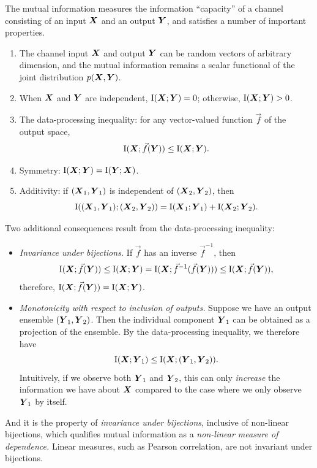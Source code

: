 \documentclass[12pt]{article}
\begin{document}
The mutual information measures the information ``capacity'' of a
channel consisting of an input $\boldsymbol{X}$ and an output $\boldsymbol{Y}$, and
satisfies a number of important properties.
\begin{enumerate}
\item The channel input $\boldsymbol{X}$ and output $\boldsymbol{Y}$ can be random vectors of arbitrary dimension, and the mutual information remains a scalar functional of the joint distribution $p(\boldsymbol{X}, \boldsymbol{Y})$.
\item When $\boldsymbol{X}$ and $\boldsymbol{Y}$ are independent, $\text{I}(\boldsymbol{X}; \boldsymbol{Y}) = 0$; otherwise, $\text{I}(\boldsymbol{X}; \boldsymbol{Y}) > 0$.
\item The data-processing inequality: for any vector-valued function $\vec{f}$ of the output space,
\[
\text{I}(\boldsymbol{X}; \vec{f}(\boldsymbol{Y})) \leq \text{I}(\boldsymbol{X}; \boldsymbol{Y}).
\]
\item Symmetry: $\text{I}(\boldsymbol{X}; \boldsymbol{Y}) = \text{I}(\boldsymbol{Y}; \boldsymbol{X})$.
\item Additivity: if $(\boldsymbol{X}_1,\boldsymbol{Y}_1)$ is independent of $(\boldsymbol{X}_2, \boldsymbol{Y}_2)$, then
\[
\text{I}((\boldsymbol{X}_1,\boldsymbol{Y}_1); (\boldsymbol{X}_2, \boldsymbol{Y}_2)) = \text{I}(\boldsymbol{X}_1; \boldsymbol{Y}_1) + \text{I}(\boldsymbol{X}_2; \boldsymbol{Y}_2).
\]
\end{enumerate}
Two additional consequences result from the data-processing inequality:
\begin{itemize}
\item \emph{Invariance under bijections.} If $\vec{f}$ has an inverse $\vec{f}^{-1}$, then 
\[
\text{I}(\boldsymbol{X}; \vec{f}(\boldsymbol{Y})) \leq \text{I}(\boldsymbol{X}; \boldsymbol{Y}) = \text{I}(\boldsymbol{X}; \vec{f}^{-1}(\vec{f}(\boldsymbol{Y}))) \leq \text{I}(\boldsymbol{X}; \vec{f}(\boldsymbol{Y})),
\]
therefore, $\text{I}(\boldsymbol{X}; \vec{f}(\boldsymbol{Y})) = \text{I}(\boldsymbol{X}; \boldsymbol{Y})$.
\item \emph{Monotonicity with respect to inclusion of outputs.}  Suppose we have an output ensemble $(\boldsymbol{Y}_1,\boldsymbol{Y}_2)$.  Then the individual component $\boldsymbol{Y}_1$ can be obtained as a projection of the ensemble.  By the data-processing inequality, we therefore have
\[
\text{I}(\boldsymbol{X}; \boldsymbol{Y}_1) \leq \text{I}(\boldsymbol{X}; (\boldsymbol{Y}_1, \boldsymbol{Y}_2)).
\]
Intuitively, if we observe both $\boldsymbol{Y}_1$ and $\boldsymbol{Y}_2$, this can
only \emph{increase} the information we have about $\boldsymbol{X}$ compared to
the case where we only observe $\boldsymbol{Y}_1$ by itself.
\end{itemize}
And it is the property of \emph{invariance under bijections},
inclusive of non-linear bijections, which qualifies mutual information
as a \emph{non-linear measure of dependence.}  Linear measures, such
as Pearson correlation, are not invariant under bijections.  
\end{document}
